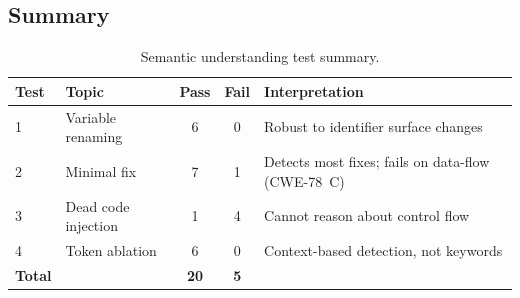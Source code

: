 \subsection{Summary}

\begin{table}[H]
  \centering
  \caption{Semantic understanding test summary.}
  \label{tab:understanding_summary}
  \begin{tabular}{llccp{5.5cm}}
    \toprule
    Test & Topic & Pass & Fail & Interpretation \\
    \midrule
    1 & Variable renaming  & 6 & 0 & Robust to identifier surface changes \\
    2 & Minimal fix        & 7 & 1 & Detects most fixes; fails on data-flow (CWE-78~C) \\
    3 & Dead code injection & 1 & 4 & Cannot reason about control flow \\
    4 & Token ablation     & 6 & 0 & Context-based detection, not keywords \\
    \midrule
    \textbf{Total} & & \textbf{20} & \textbf{5} & \\
    \bottomrule
  \end{tabular}
\end{table}
